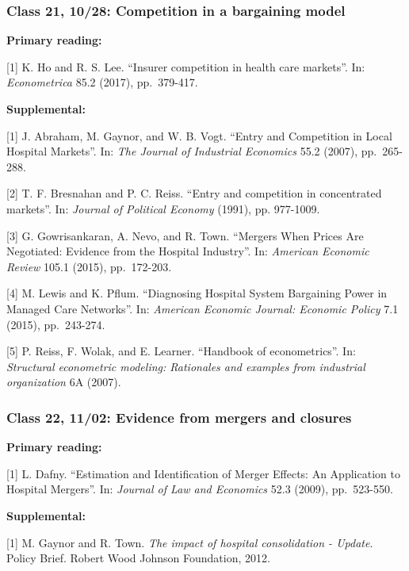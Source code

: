 \documentclass[11pt,]{article}
\begin{document}
\hypertarget{class-21-1028-competition-in-a-bargaining-model}{%
\subsubsection{Class 21, 10/28: Competition in a bargaining
model}\label{class-21-1028-competition-in-a-bargaining-model}}

\textbf{Primary reading:}

{[}1{]} K. Ho and R. S. Lee. ``Insurer competition in health care
markets''. In: \emph{Econometrica} 85.2 (2017), pp.~379-417.

\textbf{Supplemental:}

{[}1{]} J. Abraham, M. Gaynor, and W. B. Vogt. ``Entry and Competition
in Local Hospital Markets''. In: \emph{The Journal of Industrial
Economics} 55.2 (2007), pp.~265-288.

{[}2{]} T. F. Bresnahan and P. C. Reiss. ``Entry and competition in
concentrated markets''. In: \emph{Journal of Political Economy} (1991),
pp. 977-1009.

{[}3{]} G. Gowrisankaran, A. Nevo, and R. Town. ``Mergers When Prices
Are Negotiated: Evidence from the Hospital Industry''. In:
\emph{American Economic Review} 105.1 (2015), pp.~172-203.

{[}4{]} M. Lewis and K. Pflum. ``Diagnosing Hospital System Bargaining
Power in Managed Care Networks''. In: \emph{American Economic Journal:
Economic Policy} 7.1 (2015), pp.~243-274.

{[}5{]} P. Reiss, F. Wolak, and E. Learner. ``Handbook of
econometrics''. In: \emph{Structural econometric modeling: Rationales
and examples from industrial organization} 6A (2007).

\hypertarget{class-22-1102-evidence-from-mergers-and-closures}{%
\subsubsection{Class 22, 11/02: Evidence from mergers and
closures}\label{class-22-1102-evidence-from-mergers-and-closures}}

\textbf{Primary reading:}

{[}1{]} L. Dafny. ``Estimation and Identification of Merger Effects: An
Application to Hospital Mergers''. In: \emph{Journal of Law and
Economics} 52.3 (2009), pp.~523-550.

\textbf{Supplemental:}

{[}1{]} M. Gaynor and R. Town. \emph{The impact of hospital
consolidation - Update}. Policy Brief. Robert Wood Johnson Foundation,
2012.
\end{document}
